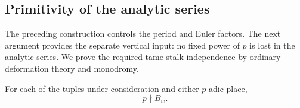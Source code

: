 \subsection{Primitivity of the analytic series}

The preceding construction controls the period and Euler factors.
The next argument provides the separate vertical input: no fixed
power of \(p\) is lost in the analytic series.  We prove the required
tame-stalk independence by ordinary deformation theory and monodromy.

\begin{proposition}\label{pair:vertical-primitivity}
For each of the tuples under consideration and either \(p\)-adic
place,
\begin{equation}
 p\nmid B_w.
 \tag{14}\label{eq:source-14}
\end{equation}
\end{proposition}

